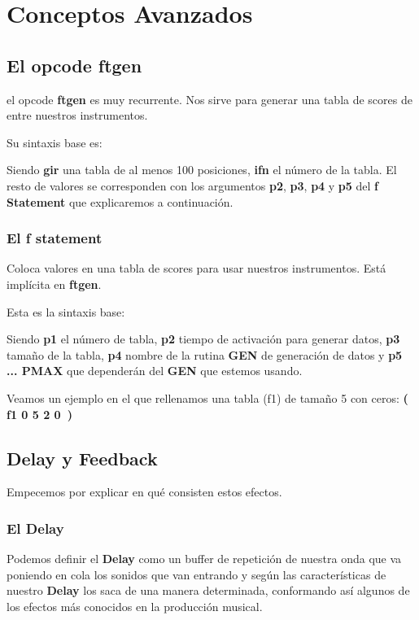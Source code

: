 
\chapter{Conceptos Avanzados}

\section{El opcode ftgen}

el opcode \textbf{ftgen} es muy recurrente. Nos sirve para generar una tabla de scores de entre nuestros instrumentos.

Su sintaxis base es:


Siendo \textbf{gir} una tabla de al menos 100 posiciones, \textbf{ifn} el número de la tabla. El resto de valores se corresponden con los argumentos \textbf{p2}, \textbf{p3}, \textbf{p4} y \textbf{p5} del \textbf{f Statement} que explicaremos a continuación.

\subsection{El f statement}

Coloca valores en una tabla de scores para usar nuestros instrumentos. Está implícita en \textbf{ftgen}.

Esta es la sintaxis base:


Siendo \textbf{p1} el número de tabla, \textbf{p2} tiempo de activación para generar datos, \textbf{p3} tamaño de la tabla, \textbf{p4} nombre de la rutina \textbf{GEN} de generación de datos y \textbf{p5 ... PMAX} que dependerán del \textbf{GEN} que estemos usando.

Veamos un ejemplo en el que rellenamos una tabla (f1) de tamaño 5 con ceros: \textbf{( f1 0 5 2 0\ )}

\section{Delay y Feedback}

Empecemos por explicar en qué consisten estos efectos. 

\subsection{El Delay}
Podemos definir el \textbf{Delay} como un buffer de repetición de nuestra onda que va poniendo en cola los sonidos que van entrando y según las características de nuestro \textbf{Delay} los saca de una manera determinada, conformando así algunos de los efectos más conocidos en la producción musical. 

